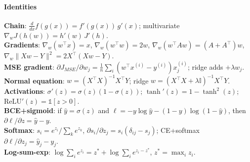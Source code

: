 \paragraph{Identities}
\textbf{Chain}: $\frac{d}{dx}f(g(x))=f'(g(x))\,g'(x)$; multivariate $\nabla_w J(h(w))=h'(w)\,J'(h)$.\\
\textbf{Gradients}: $\nabla_w(w^{\top}x)=x$, $\nabla_w(w^{\top}w)=2w$, $\nabla_w(w^{\top}Aw)=(A+A^{\top})w$, $\nabla_w\|Xw-Y\|^{2}=2X^{\top}(Xw-Y)$.\\
\textbf{MSE gradient}: $\partial J_{MSE}/\partial w_j=\tfrac{1}{n}\sum_i(w^{\top}x^{(i)}-y^{(i)})x^{(i)}_j$; ridge adds $+\lambda w_j$.\\
\textbf{Normal equation}: $w=(X^{\top}X)^{-1}X^{\top}Y$; ridge $w=(X^{\top}X+\lambda\mathbb{I})^{-1}X^{\top}Y$.\\
\textbf{Activations}: $\sigma'(z)=\sigma(z)(1-\sigma(z))$; $\tanh'(z)=1-\tanh^{2}(z)$; $\mathrm{ReLU}'(z)=\mathbb{1}[z>0]$.\\
\textbf{BCE+sigmoid}: if $\hat y=\sigma(z)$ and $\ell=-y\log\hat y-(1-y)\log(1-\hat y)$, then $\partial\ell/\partial z=\hat y-y$.\\
\textbf{Softmax}: $s_i=e^{z_i}/\!\sum_k e^{z_k}$, $\partial s_i/\partial z_j=s_i(\delta_{ij}-s_j)$; CE+softmax $\partial\ell/\partial z_j=\hat y_j-y_j$.\\
\textbf{Log-sum-exp}: $\log\sum_i e^{z_i}=z^{*}+\log\sum_i e^{z_i-z^{*}}$, $z^{*}=\max_i z_i$.\\
